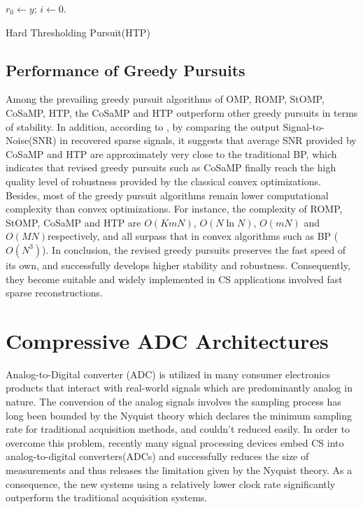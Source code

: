 \IncMargin{1em}
\begin{algorithm}
    \BlankLine
	$r_0 \gets y$; $i \gets 0$. \;
\caption{Hard Thresholding Pursuit(HTP)}\label{HTP}
\end{algorithm}
\DecMargin{1em}

\subsection{Performance of Greedy Pursuits}
\indent \indent Among the prevailing greedy pursuit algorithms of OMP, ROMP, StOMP, CoSaMP, HTP, the CoSaMP and HTP outperform other greedy pursuits in terms of stability\cite{foucart2011hard}. In addition, according to \cite{blumensath2009use}, by comparing the output Signal-to-Noise(SNR) in recovered sparse signals, it suggests that average SNR provided by CoSaMP and HTP are approximately very close to the traditional BP, which indicates that revised greedy pursuits such as CoSaMP finally reach the high quality level of robustness provided by the classical convex optimizations. Besides, most of the greedy pursuit algorithms remain lower computational complexity than convex optimizations. For instance, the complexity of ROMP, StOMP, CoSaMP and HTP are $O(KmN)$, $O(N \ln N)$, $O(mN)$ and $O(MN)$respectively, and all surpass that in convex algorithms such as BP ($O(N^3)$)\cite{qaisar2013compressive}. In conclusion, the revised greedy pursuits preserves the fast speed of its own, and successfully develops higher stability and robustness. Consequently, they become suitable and widely implemented in CS applications involved fast sparse reconstructions.  

\section{Compressive ADC Architectures}
\indent \indent Analog-to-Digital converter (ADC) is utilized in many consumer electronics products that interact with real-world signals which are predominantly analog in nature. The conversion of the analog signals involves the sampling process has long been bounded by the Nyquist theory which declares the minimum sampling rate for traditional acquisition methods, and couldn't reduced easily. In order to overcome this problem, recently many signal processing devices embed CS into analog-to-digital converters(ADCs) and successfully reduces the size of measurements and thus releases the limitation given by the Nyquist theory. As a consequence, the new systems using a relatively lower clock rate significantly outperform the traditional acquisition systems.   

